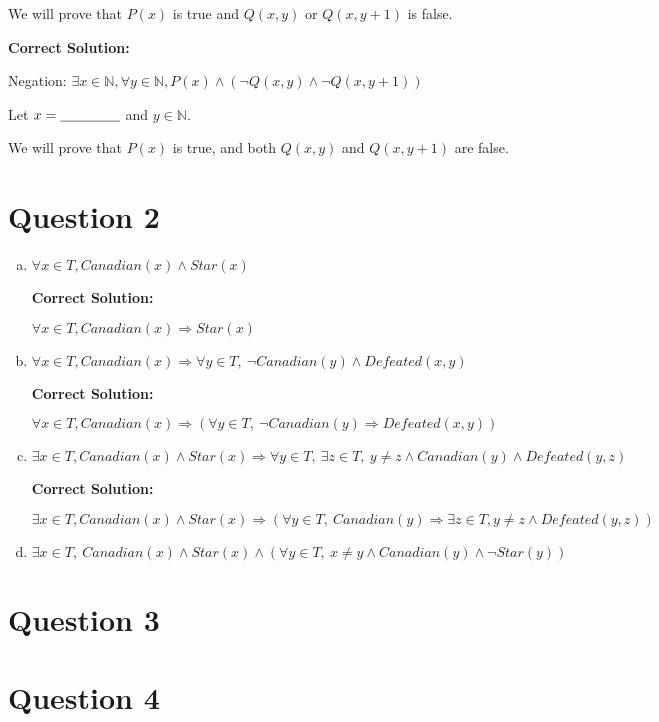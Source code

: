\documentclass[12pt]{article}
\begin{document}
\begin{enumerate}[a.]
    We will prove that $P(x)$ is true and $Q(x,y)$ or $Q(x, y+1)$ is false.

    \bigskip

    \textbf{Correct Solution:}

    Negation: $\exists x \in \mathbb{N}, \forall y \in \mathbb{N}, P(x) \land
    (\neg Q(x,y) \land \neg Q(x,y+1))$

    \bigskip

    Let $x = \underline{\hspace{1.5cm}}$ and $y \in \mathbb{N}$.

    We will prove that $P(x)$ is true, and both $Q(x,y)$ and $Q(x,y+1)$ are false.

\end{enumerate}

\section*{Question 2}
\begin{enumerate}[a.]
    \item

    $\forall x \in T, Canadian(x) \land Star(x)$

    \bigskip

    \textbf{Correct Solution:}

    $\forall x \in T, Canadian(x) \Rightarrow Star(x)$

    \item

    $\forall x \in T, Canadian(x) \Rightarrow \forall y \in T,\:\neg Canadian(y) \land Defeated(x,y)$

    \bigskip

    \textbf{Correct Solution:}

    $\forall x \in T, Canadian(x) \Rightarrow (\forall y \in T,\:\neg Canadian(y) \Rightarrow Defeated(x,y))$

    \item

    $\exists x \in T, Canadian(x) \land Star(x) \Rightarrow \forall y \in T,\:
    \exists z \in T,\: y \neq z \land Canadian(y) \land Defeated(y,z)$

    \bigskip

    \textbf{Correct Solution:}

    $\exists x \in T, Canadian(x) \land Star(x) \Rightarrow (\forall y \in T,\:
    Canadian(y) \Rightarrow \exists z \in T, y \neq z \land Defeated(y,z))$

    \item

    $\exists x \in T,\:Canadian(x) \land Star(x) \land (\forall y \in T,\: x \neq y
    \land Canadian(y) \land \neg Star(y))$

\end{enumerate}

\section*{Question 3}

\section*{Question 4}
\end{document}
